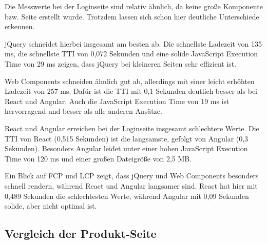 \documentclass[oneside]{ausarbeitung}
\begin{document}
Die Messwerte bei der Loginseite sind relativ ähnlich, da keine große Komponente bzw. Seite erstellt wurde. Trotzdem lassen sich schon hier deutliche Unterschiede erkennen.

jQuery schneidet hierbei insgesamt am besten ab. Die schnellste Ladezeit von 135 ms, die schnellste TTI von 0,072 Sekunden und eine solide JavaScript Execution Time von 29 ms zeigen, dass jQuery bei kleineren Seiten sehr effizient ist.

Web Components schneiden ähnlich gut ab, allerdings mit einer leicht erhöhten Ladezeit von 257 ms. Dafür ist die TTI mit 0,1 Sekunden deutlich besser als bei React und Angular. Auch die JavaScript Execution Time von 19 ms ist hervorragend und besser als alle anderen Ansätze.

React und Angular erreichen bei der Loginseite insgesamt schlechtere Werte. Die TTI von React (0,515 Sekunden) ist die langsamste, gefolgt von Angular (0,3 Sekunden). Besonders Angular leidet unter einer hohen JavaScript Execution Time von 120 ms und einer großen Dateigröße von 2,5 MB.

Ein Blick auf FCP und LCP zeigt, dass jQuery und Web Components besonders schnell rendern, während React und Angular langsamer sind. React hat hier mit 0,489 Sekunden die schlechtesten Werte, während Angular mit 0,09 Sekunden solide, aber nicht optimal ist.
\subsection{Vergleich der Produkt-Seite}
\end{document}

